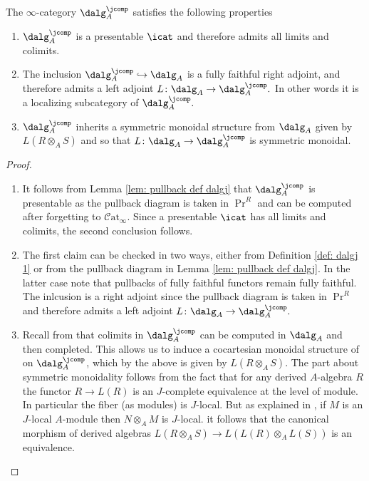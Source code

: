 \documentclass[10pt,reqno]{amsart}
\numberwithin{equation}{section}
\newcommand{\catinf}{\mathcal{C}\mathrm{at}_\infty}
\newcommand{\into}{\hookrightarrow}
\begin{document}
\begin{proposition}\label{prop: dalgj is presentable}
    The $\infty$-category $\dalg_A^\jcomp$ satisfies the following properties
    \begin{enumerate}
        \item $\dalg_A^\jcomp$ is a presentable $\icat$ and therefore admits all limits and colimits. 
        \item The inclusion $\dalg_A^\jcomp\into \dalg_A$ is a fully faithful right adjoint, and therefore admits a left adjoint $L\colon \dalg_A\to \dalg_A^\jcomp.$ In other words it is a localizing subcategory of $\dalg_A^\jcomp.$
        \item $\dalg_A^\jcomp$ inherits a symmetric monoidal structure from $\dalg_A$ given by $L(R\otimes_A S)$ and so that $L\colon \dalg_A\to \dalg_A^\jcomp$ is symmetric monoidal.
    \end{enumerate}
\end{proposition}
\begin{proof}
    \begin{enumerate}
        \item It follows from Lemma \ref{lem: pullback def dalgj} that $\dalg_A^\jcomp$ is presentable as the pullback diagram is taken in $\Pr^R$ and can be computed after forgetting to $\catinf.$ Since a presentable $\icat$ has all limits and colimits, the second conclusion follows.
        \item The first claim can be checked in two ways, either from Definition \ref{def: dalgj 1} or from the pullback diagram in Lemma \ref{lem: pullback def dalgj}. In the latter case note that pullbacks of fully faithful functors remain fully faithful. The inlcusion is a right adjoint since the pullback diagram is taken in $\Pr^R$ and therefore admits a left adjoint $L\colon \dalg_A\to \dalg_A^\jcomp.$

        \item Recall from \cite[Remark 5.2.7.5]{HTT} that colimits in $\dalg_A^\jcomp$ can be computed in $\dalg_A$ and then completed. This allows us to induce a cocartesian monoidal structure of \cite[Definition 2.4.0.1]{HA} on $\dalg_A^\jcomp$, which by the above is given by $L(R\otimes_A S).$ The part about symmetric monoidality follows from the fact that for any derived $A$-algebra $R$ the functor $R\to L(R)$ is an $J$-complete equivalence at the level of module. In particular the fiber (as modules) is $J$-local. But as explained in \cite[Remark 4.2.6]{Lur11}, if $M$ is an $J$-local $A$-module then $N\otimes_A M $ is $J$-local. it follows that the canonical morphism of derived algebras $L(R\otimes_A S)\to L(L(R)\otimes_A L(S))$ is an equivalence.
    \end{enumerate}
\end{proof}
\end{document}
